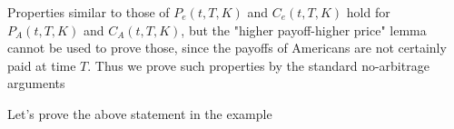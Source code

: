 \documentclass[oneside]{book}
\begin{document}

Properties similar to those of $P_e(t, T, K)$ and $C_e(t, T, K)$ hold for $P_A(t, T, K)$ and
$C_A(t, T, K)$, but the "higher payoff-higher price" lemma cannot be used to prove those,
since the payoffs of Americans are not certainly paid at time $T$. Thus we prove such
properties by the standard no-arbitrage arguments


Let's prove the above statement in the example
\end{document}
